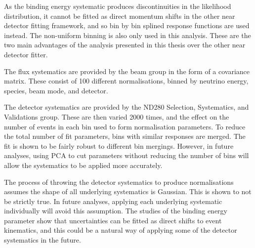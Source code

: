 As the binding energy systematic produces discontinuities in the likelihood distribution, it cannot be fitted as direct momentum shifts in the other near detector fitting framework, and so bin by bin splined response functions are used instead. The non-uniform binning is also only used in this analysis. These are the two main advantages of the analysis presented in this thesis over the other near detector fitter.

The flux systematics are provided by the beam group in the form of a covariance matrix. These consist of 100 different normalisations, binned by neutrino energy, species, beam mode, and detector.

The detector systematics are provided by the ND280 Selection, Systematics, and Validations group. These are then varied 2000 times, and the effect on the number of events in each bin used to form normalisation parameters. To reduce the total number of fit parameters, bins with similar responses are merged. The fit is shown to be fairly robust to different bin mergings. However, in future analyses, using PCA to cut parameters without reducing the number of bins will allow the systematics to be applied more accurately. 

The process of throwing the detector systematics to produce normalisations assumes the shape of all underlying systematics is Gaussian. This is shown to not be strictly true. In future analyses, applying each underlying systematic individually will avoid this assumption. The studies of the binding energy parameter show that uncertainties can be fitted as direct shifts to event kinematics, and this could be a natural way of applying some of the detector systematics in the future.

\newpage
